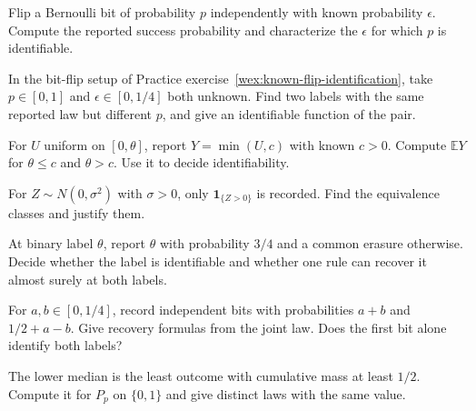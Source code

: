 \documentclass[11pt,oneside]{book}
\theoremstyle{definition}
\theoremstyle{remark}
\begin{document}
\begin{practiceexercise}
\label{wex:known-flip-identification}
Flip a Bernoulli bit of probability $p$ independently with known probability
$\epsilon$. Compute the reported success probability and characterize the
$\epsilon$ for which $p$ is identifiable.
\end{practiceexercise}

\begin{practiceexercise}
\label{wex:unknown-flip-confounding}
In the bit-flip setup of Practice
exercise~\ref{wex:known-flip-identification}, take $p\in[0,1]$ and
$\epsilon\in[0,1/4]$ both unknown. Find two labels with the same reported
law but different $p$, and give an identifiable function of the pair.
\end{practiceexercise}

\begin{practiceexercise}
\label{wex:censored-uniform-identification}
For $U$ uniform on $[0,\theta]$, report $Y=\min(U,c)$ with known $c>0$.
Compute $\mathbb E Y$ for $\theta\le c$ and $\theta>c$. Use it to decide
identifiability.
\end{practiceexercise}

\begin{practiceexercise}
\label{wex:sign-hides-variance}
For $Z\sim N(0,\sigma^2)$ with $\sigma>0$, only $\mathbf1_{\{Z>0\}}$ is
recorded. Find the equivalence classes and justify them.
\end{practiceexercise}

\begin{practiceexercise}
\label{wex:erasure-identification}
At binary label $\theta$, report $\theta$ with probability $3/4$ and a
common erasure otherwise. Decide whether the label is identifiable and
whether one rule can recover it almost surely at both labels.
\end{practiceexercise}

\begin{practiceexercise}
\label{wex:two-rate-contrasts}
For $a,b\in[0,1/4]$, record independent bits with probabilities $a+b$ and
$1/2+a-b$. Give recovery formulas from the joint law. Does the first bit
alone identify both labels?
\end{practiceexercise}

\begin{practiceexercise}
\label{wex:lower-binary-median}
The lower median is the least outcome with cumulative mass at least $1/2$.
Compute it for $P_p$ on $\{0,1\}$ and give distinct laws with the same
value.
\end{practiceexercise}
\end{document}
